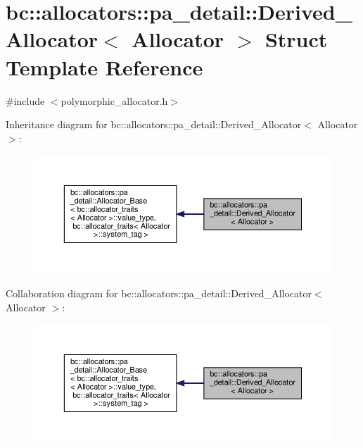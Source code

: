 \hypertarget{structbc_1_1allocators_1_1pa__detail_1_1Derived__Allocator}{}\section{bc\+:\+:allocators\+:\+:pa\+\_\+detail\+:\+:Derived\+\_\+\+Allocator$<$ Allocator $>$ Struct Template Reference}
\label{structbc_1_1allocators_1_1pa__detail_1_1Derived__Allocator}


{\ttfamily \#include $<$polymorphic\+\_\+allocator.\+h$>$}



Inheritance diagram for bc\+:\+:allocators\+:\+:pa\+\_\+detail\+:\+:Derived\+\_\+\+Allocator$<$ Allocator $>$\+:\nopagebreak
\begin{figure}[H]
\begin{center}
\leavevmode
\includegraphics[width=350pt]{structbc_1_1allocators_1_1pa__detail_1_1Derived__Allocator__inherit__graph}
\end{center}
\end{figure}


Collaboration diagram for bc\+:\+:allocators\+:\+:pa\+\_\+detail\+:\+:Derived\+\_\+\+Allocator$<$ Allocator $>$\+:\nopagebreak
\begin{figure}[H]
\begin{center}
\leavevmode
\includegraphics[width=350pt]{structbc_1_1allocators_1_1pa__detail_1_1Derived__Allocator__coll__graph}
\end{center}
\end{figure}

